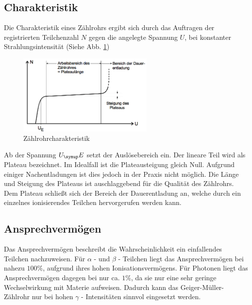 \subsection{Charakteristik}
Die Charakteristik eines Zählrohrs ergibt sich durch das Auftragen der registrierten
Teilchenzahl $N$ gegen die angelegte Spannung $U$, bei konstanter Strahlungsintensität
(Siehe Abb. \ref{fig:plateau})
\begin{figure}
  \centering
  \includegraphics[width=0.6\textwidth]{bilder/plateau}
  \caption{Zählrohrcharakteristik \cite{703}}
  \label{fig:plateau}
\end{figure}
Ab der Spannung $U_\su{E}$ setzt der Auslösebereich ein. Der lineare Teil wird als
Plateau bezeichnet. Im Idealfall ist die Plateausteigung gleich Null. Aufgrund
einiger Nachentladungen ist dies jedoch in der Praxis nicht möglich. Die Länge und
Steigung des Plateaus ist auschlaggebend für die Qualität des Zählrohrs. Dem Plateau
schließt sich der Bereich der Dauerentladung an, welche durch ein einzelnes ionisierendes
Teilchen hervorgerufen werden kann.

\subsection{Ansprechvermögen}
Das Ansprechvermögen beschreibt die Wahrscheinlichkeit ein einfallendes Teilchen
nachzuweisen. Für $\alpha$ - und $\beta$ - Teilchen liegt das Ansprechvermögen bei
nahezu $100 \%$, aufgrund ihres hohen Ionisationsvermögens.
Für Photonen liegt das Ansprechvermögen dagegen bei nur ca. $1 \%$, da sie nur eine
sehr geringe Wechselwirkung mit Materie aufweisen. Dadurch kann das Geiger-Müller-Zählrohr
nur bei hohen $\gamma$ - Intensitäten sinnvol eingesetzt werden.
